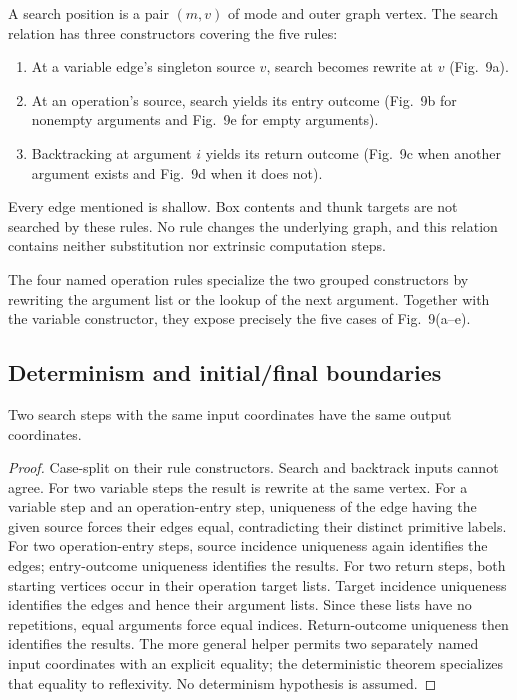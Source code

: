 \begin{definition}\label{term:search-step}
A search position is a pair $(m,v)$ of mode and outer graph vertex. The search
relation has three constructors covering the five rules:
\begin{enumerate}
\item At a variable edge's singleton source $v$, search becomes rewrite at $v$
(Fig.~9a).
\item At an operation's source, search yields its entry outcome
(Fig.~9b for nonempty arguments and Fig.~9e for empty arguments).
\item Backtracking at argument $i$ yields its return outcome
(Fig.~9c when another argument exists and Fig.~9d when it does not).
\end{enumerate}
Every edge mentioned is shallow. Box contents and thunk targets are not searched
by these rules. No rule changes the underlying graph, and this relation contains
neither substitution nor extrinsic computation steps.
\end{definition}
The four named operation rules specialize the two grouped constructors by
rewriting the argument list or the lookup of the next argument. Together with
the variable constructor, they expose precisely the five cases of Fig.~9(a--e).

\subsection{Determinism and initial/final boundaries}
\begin{theorem}
Two search steps with the same input coordinates have the same output
coordinates.
\end{theorem}
\begin{proof}
Case-split on their rule constructors. Search and backtrack inputs cannot agree.
For two variable steps the result is rewrite at the same vertex. For a variable
step and an operation-entry step, uniqueness of the edge having the given
source forces their edges equal, contradicting their distinct primitive labels.
For two operation-entry steps, source incidence uniqueness again identifies the
edges; entry-outcome uniqueness identifies the results.
For two return steps, both starting vertices occur in their operation target
lists. Target incidence uniqueness identifies the edges and hence their
argument lists. Since these lists have no repetitions, equal arguments force
equal indices. Return-outcome uniqueness then identifies the results.
The more general helper permits two separately named input coordinates with an
explicit equality; the deterministic theorem specializes that equality to
reflexivity. No determinism hypothesis is assumed.
\end{proof}

